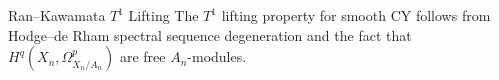 \documentclass{beamer}
\theoremstyle{definition}
\newtheorem{defn}{Definition}
\theoremstyle{plain}
\newtheorem{thm}[defn]{Theorem}
\begin{document}
\begin{frame}{Ran–Kawamata $T^1$ Lifting}
    The $T^1$ lifting property for smooth CY follows from Hodge–de Rham spectral sequence degeneration and the fact that $H^q(X_n,\Omega^p_{X_n/A_n})$ are free $A_n$-modules.
\end{frame}



\end{document}

